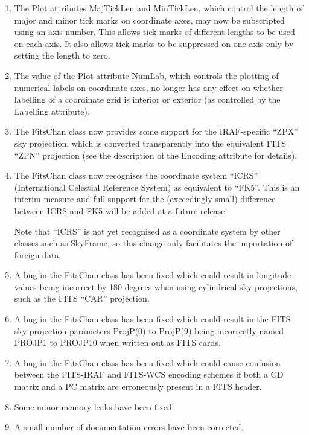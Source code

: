 \documentclass[twoside,11pt]{starlink}
\begin{document}
\begin{enumerate}
\item The Plot attributes MajTickLen and MinTickLen, which control the
length of major and minor tick marks on coordinate axes, may now be
subscripted using an axis number. This allows tick marks of different
lengths to be used on each axis. It also allows tick marks to be
suppressed on one axis only by setting the length to zero.

\item The value of the Plot attribute NumLab, which controls the
plotting of numerical labels on coordinate axes, no longer has any
effect on whether labelling of a coordinate grid is interior or
exterior (as controlled by the Labelling attribute).

\item The FitsChan class now provides some support for the
IRAF-specific ``ZPX'' sky projection, which is converted transparently
into the equivalent FITS ``ZPN'' projection (see the description of the
Encoding attribute for details).

\item The FitsChan class now recognises the coordinate system ``ICRS''
(International Celestial Reference System) as equivalent to
``FK5''. This is an interim measure and full support for the
(exceedingly small) difference between ICRS and FK5 will be added at a
future release.

Note that ``ICRS'' is not yet recognised as a coordinate system by other
classes such as SkyFrame, so this change only facilitates the
importation of foreign data.

\item A bug in the FitsChan class has been fixed which could result in
longitude values being incorrect by 180 degrees when using cylindrical
sky projections, such as the FITS ``CAR'' projection.

\item A bug in the FitsChan class has been fixed which could result in
the FITS sky projection parameters ProjP(0) to ProjP(9) being
incorrectly named PROJP1 to PROJP10 when written out as FITS cards.

\item A bug in the FitsChan class has been fixed which could cause
confusion between the FITS-IRAF and FITS-WCS encoding schemes if both
a CD matrix and a PC matrix are erroneously present in a FITS header.

\item Some minor memory leaks have been fixed.

\item A small number of documentation errors have been corrected.
\end{enumerate}
\end{document}

